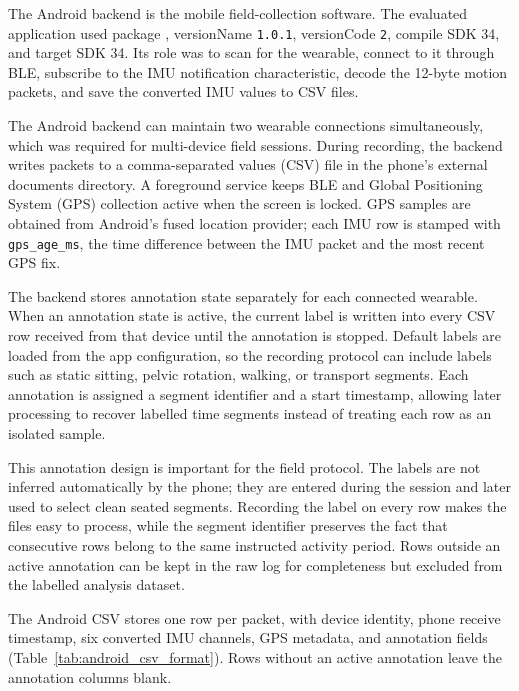 The Android backend is the mobile field-collection software. The evaluated application used package , versionName \texttt{1.0.1}, versionCode \texttt{2}, compile SDK 34, and target SDK 34. Its role was to scan for the wearable, connect to it through BLE, subscribe to the IMU notification characteristic, decode the 12-byte motion packets, and save the converted IMU values to CSV files.

The Android backend can maintain two wearable connections simultaneously, which was required for multi-device field sessions. During recording, the backend writes packets to a comma-separated values (CSV) file in the phone's external documents directory. A foreground service keeps BLE and Global Positioning System (GPS) collection active when the screen is locked. GPS samples are obtained from Android's fused location provider; each IMU row is stamped with \texttt{gps\_age\_ms}, the time difference between the IMU packet and the most recent GPS fix.

The backend stores annotation state separately for each connected wearable. When an annotation state is active, the current label is written into every CSV row received from that device until the annotation is stopped. Default labels are loaded from the app configuration, so the recording protocol can include labels such as static sitting, pelvic rotation, walking, or transport segments. Each annotation is assigned a segment identifier and a start timestamp, allowing later processing to recover labelled time segments instead of treating each row as an isolated sample.

This annotation design is important for the field protocol. The labels are not inferred automatically by the phone; they are entered during the session and later used to select clean seated segments. Recording the label on every row makes the files easy to process, while the segment identifier preserves the fact that consecutive rows belong to the same instructed activity period. Rows outside an active annotation can be kept in the raw log for completeness but excluded from the labelled analysis dataset.

The Android CSV stores one row per packet, with device identity, phone receive timestamp, six converted IMU channels, GPS metadata, and annotation fields (Table~\ref{tab:android_csv_format}). Rows without an active annotation leave the annotation columns blank.


